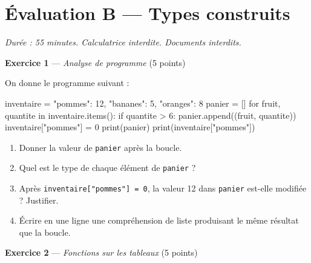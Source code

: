 \section*{Évaluation B --- Types construits}
\textit{Durée : 55 minutes. Calculatrice interdite. Documents interdits.}


\bigskip

\textbf{Exercice 1} --- \textit{Analyse de programme} \hfill (5 points)

On donne le programme suivant :
\begin{python}
inventaire = {"pommes": 12, "bananes": 5, "oranges": 8}
panier = []
for fruit, quantite in inventaire.items():
    if quantite > 6:
        panier.append((fruit, quantite))
inventaire["pommes"] = 0
print(panier)
print(inventaire["pommes"])
\end{python}


\begin{enumerate}
  \item Donner la valeur de \lstinline{panier} après la boucle.
  \item Quel est le type de chaque élément de \lstinline{panier} ?
  \item Après \lstinline{inventaire["pommes"] = 0}, la valeur 12
        dans \lstinline{panier} est-elle modifiée ? Justifier.
  \item Écrire en une ligne une compréhension de liste produisant le même
        résultat que la boucle.
\end{enumerate}

\bigskip

\textbf{Exercice 2} --- \textit{Fonctions sur les tableaux} \hfill (5 points)


